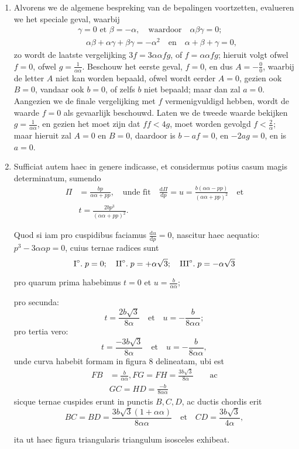 \documentclass[10pt,a4paper]{article}
\newcommand{\switchenum}{\setcounter{enumi}{\arabic{enumi}-1}\switchcolumn}
\def\D{\mathrm{d}}
\begin{document}
\begin{paracol}{2}
\begin{enumerate}[topsep=1px]
		\switchenum
			\item Alvorens we de algemene bespreking van de bepalingen voortzetten, evalueren we het speciale geval, waarbij
		\begin{align*}
			&\gamma = 0 \text{ et } \beta = -\alpha, \quad \text{waardoor} \quad \alpha\beta\gamma = 0;\\
			&\quad \alpha\beta+\alpha \gamma+\beta \gamma = -\alpha^2 \quad \text{en} \quad \alpha+\beta+ \gamma = 0,
		\end{align*}
		zo wordt de laatste vergelijking  $3f = 3\alpha \alpha f g$,  of $f=\alpha \alpha fg$; hieruit volgt ofwel $f=0$, ofwel $g=\frac{1}{\alpha \alpha}$. Beschouw het eerste geval, $f=0$, en dus $A = -\frac{0}{0}$, waarbij de letter $A$ niet kan worden bepaald, ofwel wordt eerder $A=0$, gezien ook $B=0$, vandaar ook $b=0$, of zelfs $b$ niet bepaald;  maar dan zal $a=0$. Aangezien we de finale vergelijking met $f$ vermenigvuldigd hebben, wordt de waarde $f=0$ als gevaarlijk beschouwd. Laten we de tweede waarde bekijken $g=\frac{1}{\alpha \alpha}$, en gezien het moet zijn dat $ff<4g$, moet worden gevolgd $f< \frac{2}{\alpha}$; maar hieruit zal $A=0$ en $B=0$, daardoor is $b-af=0$, en $-2a g = 0$, en is $a=0$.

		\switchcolumn*
		
		\item Sufficiat autem haec in genere indicasse, et considermus potius casum magis determinatum, sumendo 
		\begin{align*}
			\Pi &= \frac{bp}{\alpha \alpha + pp},\quad \text{unde fit} \quad \frac{\D \Pi}{\D p} =u = \frac{b(\alpha\alpha- pp)}{(\alpha\alpha+pp)^2}\quad \text{et}\\
			&t = \frac{2bp^3}{(\alpha \alpha+pp)^2}.
		\end{align*}

		\par Quod si iam pro cuspidibus faciamus $\frac{\D u}{\D p}=0$, nascitur haec aequatio: $p^3-3\alpha \alpha p = 0$, cuius ternae radices sunt
		\[
			\text{I}\degree.\; p=0;\quad \text{II}\degree.\; p=+\alpha\sqrt{3};\quad  \text{III}\degree.\; p=-\alpha \sqrt{3}
		\]
		\par pro quarum prima habebimus $t=0$ et $u=\frac{b}{\alpha \alpha}$;
		\par pro secunda:
		\[
			t = \frac{2b\sqrt{3}}{8\alpha} \quad \text{et} \quad u = -\frac{b}{8\alpha \alpha};
		\]
		pro tertia vero:
		\[
			t = \frac{-3b\sqrt{3}}{8\alpha} \quad \text{et} \quad u = -\frac{b}{8\alpha \alpha},
		\]
		unde curva habebit formam in figura 8 delineatam, ubi est
		\begin{align*}
			FB &= \frac{b}{\alpha\alpha}, FG = FH = \frac{3b\sqrt{3}}{8\alpha} \qquad\text{ac}\\
			&GC=HD=\frac{-b}{8\alpha \alpha}
		\end{align*}
		sicque ternae cuspides erunt in punctis $B, C, D$, ac ductis chordis erit
		\[
			BC = BD = \frac{3b\sqrt{3}(1+ \alpha \alpha)}{8\alpha \alpha} \quad \text{et} \quad CD = \frac{3b\sqrt{3}}{4\alpha},
		\]
		\par ita ut haec figura triangularis triangulum isosceles exhibeat.
		

\end{enumerate}
\end{paracol}
\end{document}

